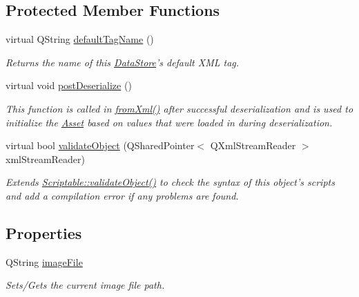 \subsection*{Protected Member Functions}
\begin{DoxyCompactItemize}
\item 
virtual Q\-String \hyperlink{class_picto_1_1_picture_graphic_a92db57f574c60db5e468276f972903e3}{default\-Tag\-Name} ()
\begin{DoxyCompactList}\small\item\em Returns the name of this \hyperlink{class_picto_1_1_data_store}{Data\-Store}'s default X\-M\-L tag. \end{DoxyCompactList}\item 
virtual void \hyperlink{class_picto_1_1_picture_graphic_a85cbf24ef376531ab66f10487d16721a}{post\-Deserialize} ()
\begin{DoxyCompactList}\small\item\em This function is called in \hyperlink{class_picto_1_1_asset_a8bed4da09ecb1c07ce0dab313a9aba67}{from\-Xml()} after successful deserialization and is used to initialize the \hyperlink{class_picto_1_1_asset}{Asset} based on values that were loaded in during deserialization. \end{DoxyCompactList}\item 
\hypertarget{class_picto_1_1_picture_graphic_acb06b30d3f14c7dbe294e0ae0dae9f60}{virtual bool \hyperlink{class_picto_1_1_picture_graphic_acb06b30d3f14c7dbe294e0ae0dae9f60}{validate\-Object} (Q\-Shared\-Pointer$<$ Q\-Xml\-Stream\-Reader $>$ xml\-Stream\-Reader)}\label{class_picto_1_1_picture_graphic_acb06b30d3f14c7dbe294e0ae0dae9f60}

\begin{DoxyCompactList}\small\item\em Extends \hyperlink{class_picto_1_1_scriptable_ab6e2944c43a3b5d418bf7b251594386d}{Scriptable\-::validate\-Object()} to check the syntax of this object's scripts and add a compilation error if any problems are found. \end{DoxyCompactList}\end{DoxyCompactItemize}
\subsection*{Properties}
\begin{DoxyCompactItemize}
\item 
\hypertarget{class_picto_1_1_picture_graphic_ac154fa6eb2a9b4046da01de691f8b56c}{Q\-String \hyperlink{class_picto_1_1_picture_graphic_ac154fa6eb2a9b4046da01de691f8b56c}{image\-File}}\label{class_picto_1_1_picture_graphic_ac154fa6eb2a9b4046da01de691f8b56c}

\begin{DoxyCompactList}\small\item\em Sets/\-Gets the current image file path. \end{DoxyCompactList}\end{DoxyCompactItemize}
